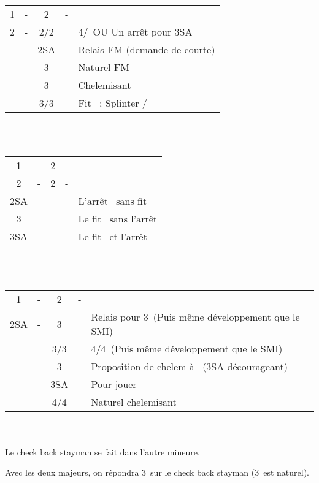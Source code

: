 \documentclass[a4paper, oneside, 11pt]{report}
\begin{document}
		\begin{tabular}{cccc|l}
		1\carreau & - & 2\trefle & - &\\
		2\carreau & - & 2\coeur/2\pique && 4\coeur/\pique\ OU Un arrêt pour 3SA\\
		&& 2SA && Relais FM (demande de courte)\\
		&& 3\trefle && Naturel FM\\
		&& 3\carreau && Chelemisant \carreau\\
		&& 3\coeur/3\pique && Fit \carreau\ ; Splinter \coeur/\pique\\
		\end{tabular}\\\\

		\begin{tabular}{cccc|l}
		1\carreau & - & 2\trefle & - &\\
		2\carreau & - & 2\coeur & - &\\
		2SA &&&& L'arrêt \pique\ sans fit \coeur\\
		3\coeur &&&& Le fit \coeur\ sans l'arrêt \pique\\
		3SA&&&& Le fit \coeur\ et l'arrêt \pique\\
		\end{tabular}\\\\

		\begin{tabular}{cccc|l}
		1\carreau & - & 2\trefle & - &\\
		2SA & - & 3\trefle && Relais pour 3\carreau\ (Puis même développement que le SMI)\\
		&& 3\carreau/3\coeur && 4\coeur/4\pique\ (Puis même développement que le SMI)\\
		&& 3\pique && Proposition de chelem à \trefle\ (3SA décourageant)\\
		&& 3SA && Pour jouer\\
		&& 4\trefle/4\carreau && Naturel chelemisant\\
		\end{tabular}\\\\

		Le check back stayman se fait dans l'autre mineure.

		Avec les deux majeurs, on répondra 3\coeur\ sur le check back stayman (3\carreau\ est naturel).\\
\end{document}
